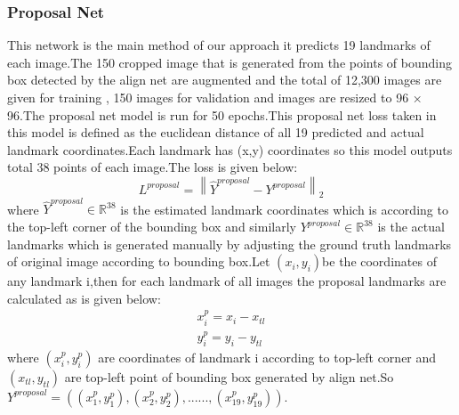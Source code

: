 \documentclass[sn-mathphys]{sn-jnl}%
\theoremstyle{thmstyleone}%
\theoremstyle{thmstyletwo}%
\theoremstyle{thmstylethree}%
\begin{document}
\subsubsection{Proposal Net}
This network is the main method of our approach it predicts 19 landmarks of each image.The 150 cropped image that is generated from the points of bounding box detected by the align net are augmented and the total of 12,300 images are given for training , 150 images for validation and images are resized to 96 × 96.The proposal net model is run for 50 epochs.This proposal net loss taken in this model is defined as the euclidean distance of all 19 predicted and actual landmark coordinates.Each landmark has (x,y) coordinates so this model outputs total 38 points of each image.The loss is given below:
\begin{equation}
    L^{proposal} = \left \| \hat{Y}^{proposal} - Y^{proposal} \right \|_{2}
\end{equation}
where
\begin{math} \hat{Y}^{proposal} \in \mathbb{R}^{38} \end{math} is the estimated landmark coordinates which is according to the top-left corner of the bounding box and similarly \begin{math} Y^{proposal} \in \mathbb{R}^{38}  \end{math} is the actual landmarks which is generated manually by adjusting the ground truth landmarks of original image according to bounding box.Let \begin{math} (x_{i},y_{i}) \end{math}be the coordinates of any landmark i,then for each landmark of all images the proposal landmarks are calculated as is given below:
\begin{align*}
    x^{p}_{i} = x_{i} - x_{tl}\\
    y^{p}_{i} = y_{i} - y_{tl}
\end{align*}
 where \begin{math}(x^{p}_{i},y^{p}_{i}) \end{math} are coordinates of landmark i according to top-left corner and \begin{math}
 (x_{tl},y_{tl}) \end{math} are top-left point of bounding box generated by align net.So \begin{math}
 Y^{proposal} = ((x^{p}_{1},y^{p}_{1}) , (x^{p}_{2},y^{p}_{2}),...... ,(x^{p}_{19},y^{p}_{19})).
 \end{math}
\end{document}
